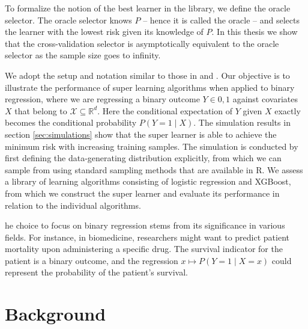 \documentclass[11pt, a4paper]{article}
\theoremstyle{definition}
\theoremstyle{remark}
\begin{document}
To formalize the notion of the best learner in the library, we define the oracle selector. The oracle selector knows $ P $ -- hence it is called the oracle -- and selects the learner with the lowest risk given its knowledge of $ P $. In this thesis we show that the cross-validation selector is asymptotically equivalent to the oracle selector as the sample size goes to infinity. 

We adopt the setup and notation similar to those in \cite{vaart06} and \cite{laan03}. Our objective is to illustrate the performance of super learning algorithms when applied to binary regression, where we are regressing a binary outcome $ Y \in {0,1} $ against covariates $ X $ that belong to $ \mathcal{X} \subseteq \mathbb{R}^{d} $. Here the conditional expectation of $ Y $ given $ X $ exactly becomes the conditional probability $ P(Y = 1 \mid X) $. The simulation results in section \ref{sec:simulations} show that the super learner is able to achieve the minimum risk with increasing training samples. The simulation is conducted by first defining the data-generating distribution explicitly, from which we can sample from using standard sampling methods that are available in R. We assess a library of learning algorithms consisting of logistic regression and XGBoost, from which we construct the super learner and evaluate its performance in relation to the individual algorithms.

he choice to focus on binary regression stems from its significance in various fields. For instance, in biomedicine, researchers might want to predict patient mortality upon administering a specific drug. The survival indicator for the patient is a binary outcome, and the regression $ x \mapsto P(Y = 1 \mid X = x) $ could represent the probability of the patient's survival. 

\section{Background}
\end{document}
